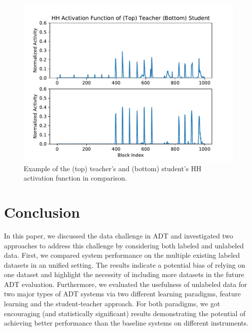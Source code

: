 \documentclass{article}
\begin{document}
\begin{figure}
\centering
\includegraphics[width = \columnwidth]{./figs/example_activ.pdf}
\caption{Example of the (top) teacher's and (bottom) student's HH activation function in comparison.}
\label{fig:exampleActiv}
\end{figure}


\section{Conclusion}
\label{sec:conc}

In this paper, we discussed the data challenge in ADT and investigated two approaches to address this challenge by considering both labeled and unlabeled data. First, we compared system performance on the multiple existing labeled datasets in an unified setting. The results indicate a potential bias of relying on one dataset and highlight the necessity of including more datasets in the future ADT evaluation. Furthermore, we evaluated the usefulness of unlabeled data for two major types of ADT systems via two different learning paradigms, feature learning and the student-teacher approach. For both paradigms, we got encouraging (and statistically significant) results demonstrating the potential of achieving better performance than the baseline systems on different instruments.
\end{document}
